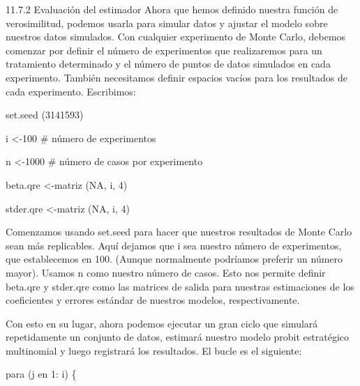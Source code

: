 \documentclass[
]{book}
\begin{document}
11.7.2 Evaluación del estimador
Ahora que hemos definido nuestra función de verosimilitud, podemos usarla para simular datos y ajustar el modelo sobre nuestros datos simulados. Con cualquier experimento de Monte Carlo, debemos comenzar por definir el número de experimentos que realizaremos para un tratamiento determinado y el número de puntos de datos simulados en cada experimento. También necesitamos definir espacios vacíos para los resultados de cada experimento. Escribimos:

set.seed (3141593)

i \textless-100 \# número de experimentos

n \textless-1000 \# número de casos por experimento

beta.qre \textless-matriz (NA, i, 4)

stder.qre \textless-matriz (NA, i, 4)

Comenzamos usando set.seed para hacer que nuestros resultados de Monte Carlo sean más replicables. Aquí dejamos que i sea \hspace{0pt}\hspace{0pt}nuestro número de experimentos, que establecemos en 100. (Aunque normalmente podríamos preferir un número mayor). Usamos n como nuestro número de casos. Esto nos permite definir beta.qre y stder.qre como las matrices de salida para nuestras estimaciones de los coeficientes y errores estándar de nuestros modelos, respectivamente.

Con esto en su lugar, ahora podemos ejecutar un gran ciclo que simulará repetidamente un conjunto de datos, estimará nuestro modelo probit estratégico multinomial y luego registrará los resultados. El bucle es el siguiente:

para (j en 1: i) \{
\end{document}
